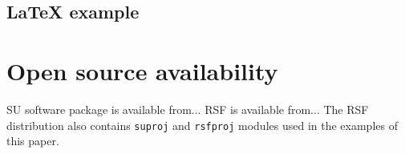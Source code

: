 





\subsection{LaTeX example}



\section{Open source availability}

SU software package is available from... RSF is available from... The
RSF distribution also contains \texttt{suproj} and \texttt{rsfproj}
modules used in the examples of this paper.




